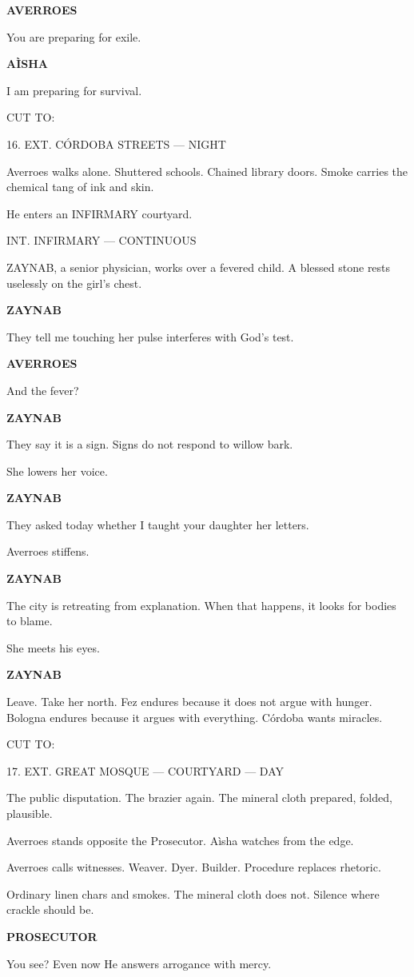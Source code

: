 \documentclass[12pt]{article}
\newlength{\charindent}
\newlength{\dialogueindent}
\newlength{\dialoguewidth}
\newlength{\transitionindent}
\newcommand{\slug}[1]{\vspace{1.25em}\textsc{#1}\vspace{0.5em}}
\newcommand{\action}[1]{#1}
\newcommand{\character}[1]{%
  \par\vspace{0.75em}%
  \hspace*{\charindent}\textbf{#1}%
}
\newcommand{\dialogue}[1]{%
  \par\nobreak
  \hspace*{\dialogueindent}%
  \begin{minipage}[t]{\dialoguewidth}
  #1
  \end{minipage}
}
\newcommand{\transition}[1]{%
  \par\vspace{1em}%
  \hspace*{\transitionindent}\textsc{#1}%
}
\begin{document}
\character{AVERROES}
\dialogue{You are preparing for exile.}

\character{A\`ISHA}
\dialogue{I am preparing for survival.}

\transition{CUT TO:}

\slug{16. EXT. CÓRDOBA STREETS --- NIGHT}

\action{Averroes walks alone. Shuttered schools. Chained library doors. Smoke carries the chemical tang of ink and skin.}

\action{He enters an INFIRMARY courtyard.}

\slug{INT. INFIRMARY --- CONTINUOUS}

\action{ZAYNAB, a senior physician, works over a fevered child. A blessed stone rests uselessly on the girl’s chest.}

\character{ZAYNAB}
\dialogue{They tell me touching her pulse interferes with God’s test.}

\character{AVERROES}
\dialogue{And the fever?}

\character{ZAYNAB}
\dialogue{They say it is a sign. Signs do not respond to willow bark.}

\action{She lowers her voice.}

\character{ZAYNAB}
\dialogue{They asked today whether I taught your daughter her letters.}

\action{Averroes stiffens.}

\character{ZAYNAB}
\dialogue{The city is retreating from explanation. When that happens, it looks for bodies to blame.}

\action{She meets his eyes.}

\character{ZAYNAB}
\dialogue{Leave. Take her north. Fez endures because it does not argue with hunger. Bologna endures because it argues with everything. Córdoba wants miracles.}

\transition{CUT TO:}

\slug{17. EXT. GREAT MOSQUE --- COURTYARD --- DAY}

\action{The public disputation. The brazier again. The mineral cloth prepared, folded, plausible.}

\action{Averroes stands opposite the Prosecutor. A\`isha watches from the edge.}

\action{Averroes calls witnesses. Weaver. Dyer. Builder. Procedure replaces rhetoric.}

\action{Ordinary linen chars and smokes. The mineral cloth does not. Silence where crackle should be.}

\character{PROSECUTOR}
\dialogue{You see? Even now He answers arrogance with mercy.}
\end{document}

